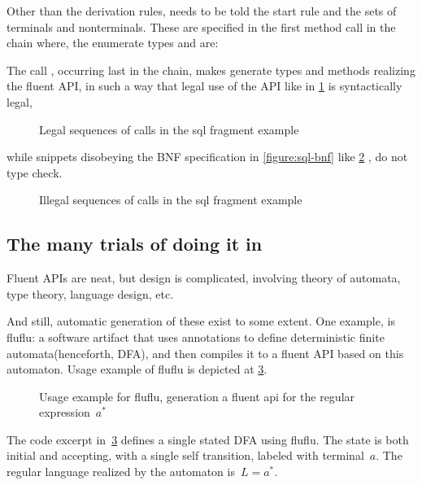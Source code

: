 Other than the derivation rules, \Fajita needs to be told the start rule
  and the sets of terminals and nonterminals.
These are specified in the first method call in the chain where,
  the enumerate types  and  are:

\begin{quote}
\end{quote}

The call , occurring last in the chain, makes \Fajita generate types
and methods realizing the fluent API, in such a way that legal use of the API
like in \cref{figure:sql:legal} is syntactically legal,

\begin{figure}[H]
  \caption{\label{figure:sql:legal}
  Legal sequences of calls in the sql fragment example}

\end{figure}

while snippets disobeying the BNF specification in \cref{figure:sql-bnf} like
\cref{figure:sql:illegal} , do not type check.

\begin{figure}[H]
  \caption{\label{figure:sql:illegal}
  Illegal sequences of calls in the sql fragment example}
\end{figure}

\subsection{The many trials of doing it in \Java}
Fluent APIs are neat, but design is complicated,
involving theory of automata, type theory, language design, etc.

And still, automatic generation of these exist to some extent.
One example, is fluflu: a software artifact that uses
\Java annotations to define deterministic finite automata(henceforth, DFA), and then
compiles it to a fluent API based on this automaton. Usage example of fluflu is
depicted at \cref{figure:fluflu}.

\begin{figure}[ht]
  \caption{\label{figure:fluflu}
    Usage example for fluflu, generation a fluent
  api for the regular expression~$a^*$}
\end{figure}
The code excerpt in~\cref{figure:fluflu} defines a single stated DFA using
fluflu. The state is both initial and accepting, with a single self
transition, labeled with terminal~$a$. The regular language realized by the
automaton is~$L=a^*$.

